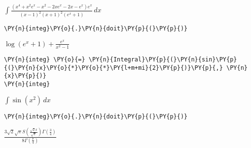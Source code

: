             
    
    $\displaystyle \int \frac{\left(x^{4} + x^{2} e^{x} - x^{2} - 2 x e^{x} - 2 x - e^{x}\right) e^{x}}{\left(x - 1\right)^{2} \left(x + 1\right)^{2} \left(e^{x} + 1\right)}\, dx$

    

    \begin{tcolorbox}[breakable, size=fbox, boxrule=1pt, pad at break*=1mm,colback=cellbackground, colframe=cellborder]
\begin{Verbatim}[commandchars=\\\{\}]
\PY{n}{integ}\PY{o}{.}\PY{n}{doit}\PY{p}{(}\PY{p}{)}
\end{Verbatim}
\end{tcolorbox}
 
            
    
    $\displaystyle \log{\left(e^{x} + 1 \right)} + \frac{e^{x}}{x^{2} - 1}$

    

    \begin{tcolorbox}[breakable, size=fbox, boxrule=1pt, pad at break*=1mm,colback=cellbackground, colframe=cellborder]
\begin{Verbatim}[commandchars=\\\{\}]
\PY{n}{integ} \PY{o}{=} \PY{n}{Integral}\PY{p}{(}\PY{n}{sin}\PY{p}{(}\PY{n}{x}\PY{o}{*}\PY{o}{*}\PY{l+m+mi}{2}\PY{p}{)}\PY{p}{,} \PY{n}{x}\PY{p}{)}
\PY{n}{integ}
\end{Verbatim}
\end{tcolorbox}
 
            
    
    $\displaystyle \int \sin{\left(x^{2} \right)}\, dx$

    

    \begin{tcolorbox}[breakable, size=fbox, boxrule=1pt, pad at break*=1mm,colback=cellbackground, colframe=cellborder]
\begin{Verbatim}[commandchars=\\\{\}]
\PY{n}{integ}\PY{o}{.}\PY{n}{doit}\PY{p}{(}\PY{p}{)}
\end{Verbatim}
\end{tcolorbox}
 
            
    
    $\displaystyle \frac{3 \sqrt{2} \sqrt{\pi} S\left(\frac{\sqrt{2} x}{\sqrt{\pi}}\right) \Gamma\left(\frac{3}{4}\right)}{8 \Gamma\left(\frac{7}{4}\right)}$
